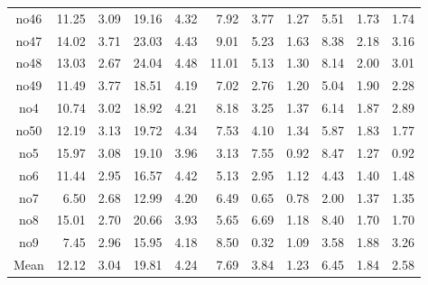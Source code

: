 {\begin{longtable}{@{}cr@{\hspace{1em}}r@{\hspace{1em}}r@{\hspace{1em}}r@{\hspace{1em}}r@{\hspace{2em}}r@{\hspace{1em}}r@{\hspace{1em}}r@{\hspace{1em}}r@{\hspace{1em}}r@{}}
no46&11.25&3.09&19.16&4.32&7.92&3.77&1.27&5.51&1.73&1.74\\
no47&14.02&3.71&23.03&4.43&9.01&5.23&1.63&8.38&2.18&3.16\\
no48&13.03&2.67&24.04&4.48&11.01&5.13&1.30&8.14&2.00&3.01\\
no49&11.49&3.77&18.51&4.19&7.02&2.76&1.20&5.04&1.90&2.28\\
no4&10.74&3.02&18.92&4.21&8.18&3.25&1.37&6.14&1.87&2.89\\
no50&12.19&3.13&19.72&4.34&7.53&4.10&1.34&5.87&1.83&1.77\\
no5&15.97&3.08&19.10&3.96&3.13&7.55&0.92&8.47&1.27&0.92\\
no6&11.44&2.95&16.57&4.42&5.13&2.95&1.12&4.43&1.40&1.48\\
no7&6.50&2.68&12.99&4.20&6.49&0.65&0.78&2.00&1.37&1.35\\
no8&15.01&2.70&20.66&3.93&5.65&6.69&1.18&8.40&1.70&1.70\\
no9&7.45&2.96&15.95&4.18&8.50&0.32&1.09&3.58&1.88&3.26\\
\midrule
Mean&12.12&3.04&19.81&4.24&7.69&3.84&1.23&6.45&1.84&2.58\\
\bottomrule
\end{longtable}}
